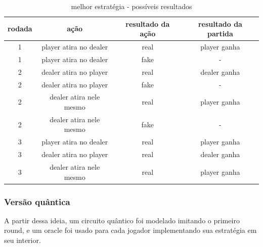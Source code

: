 \documentclass{article}
\begin{document}
\begin{table}[!h]
	\begin{center}
		\begin{tabular}{ |c|c|c|c| } 
			\hline
			rodada & ação & resultado da ação & resultado da partida \\
			\hline
			1 & player atira no dealer  & real & player ganha\\
			\hline
			1 & player atira no dealer  & fake & -\\
			\hline
			2 & dealer atira no player  & real & dealer ganha\\
			\hline
			2 & dealer atira no player  & fake & -\\
			\hline
			2 & dealer atira nele mesmo  & real & player ganha\\
			\hline
			2 & dealer atira nele mesmo  & fake & -\\
			\hline
			3 & player atira no dealer  & real & player ganha\\
			\hline
			3 & dealer atira no player & real & dealer ganha\\
			\hline
			3 & dealer atira nele mesmo  & real & player ganha\\
			\hline
		\end{tabular}
		\caption{melhor estratégia - possíveis resultados}
	\end{center}
\end{table}

\subsubsection{Versão quântica}

A partir dessa ideia, um circuito quântico foi modelado imitando o primeiro round, e um oracle foi usado para cada jogador implementando sua estratégia em seu interior.
\end{document}
